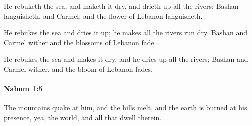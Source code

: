 			\begin{versebox}
					\item[BHS] 
					\item[LXX] 
					\item[ASV] He rebuketh the sea, and maketh it dry, and drieth up all the rivers: Bashan languisheth, and Carmel; and the flower of Lebanon languisheth.
					\item[NIV] He rebukes the sea and dries it up; he makes all the rivers run dry. Bashan and Carmel wither and the blossoms of Lebanon fade.
					\item[NRSV] He rebukes the sea and makes it dry, and he dries up all the rivers; Bashan and Carmel wither, and the bloom of Lebanon fades.
			\end{versebox}

		\paragraph{Nahum 1:5} %
			\label{NAHUM-1-5}

			The mountains quake at him, and the hills melt, and the earth is burned at his presence, yea, the world, and all that dwell therein.

